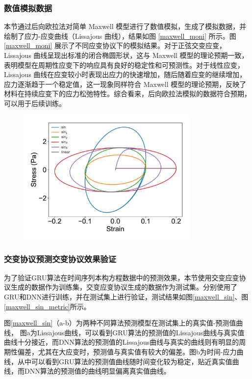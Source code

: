 \subsubsection{数值模拟数据}
本节通过后向欧拉法对简单 Maxwell 模型进行了数值模拟，生成了模拟数据，并绘制了应力-应变曲线（Lissajous 曲线），结果如图 \ref{maxwell_moni} 所示。图 \ref{maxwell_moni} 展示了不同应变协议下的模拟结果。对于正弦交变应变，Lissajous 曲线呈现出标准的闭合椭圆形状，这与 Maxwell 模型的理论预期一致，表明模型在周期性应变下的响应具有良好的稳定性和可预测性。对于线性应变，Lissajous 曲线在应变较小时表现出应力的快速增加，随后随着应变的继续增加，应力逐渐趋于一个稳定值，这一现象同样符合 Maxwell 模型的理论预期，反映了材料在持续应变下的应力松弛特性。综合看来，后向欧拉法模拟的数据符合预期，可以用于后续训练。
\begin{figure}[htbp]
  \centering
  \includegraphics[width=0.8\textwidth]{Fig/maxwell_moni.pdf}
\end{figure}

\subsubsection{交变协议预测交变协议效果验证}
为了验证GRU算法在时间序列本构方程数据中的预测效果，本节使用交变应变协议生成的数据作为训练集，交变应变协议生成的数据作为测试集。分别使用了GRU和DNN进行训练，并在测试集上进行验证，测试结果如图\ref{maxwell_sin}、图\ref{maxwell_sin_metric}所示。

图\ref{maxwell_sin}（a-b）为两种不同算法预测模型在测试集上的真实值-预测值曲线，
图a为Lissajous曲线，可以看到GRU算法的预测值的Lissajous曲线与真实值曲线十分接近，而DNN算法的预测值的Lissajous曲线与真实的曲线则有明显的周期性偏差，尤其在大应变时，预测值与真实值有较大的偏差。图b为时间-应力曲线，从中可以看到GRU算法的预测值曲线随时间变化较为稳定，贴近真实值曲线，而DNN算法的预测值的曲线明显偏离真实值曲线。

